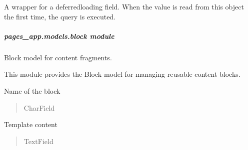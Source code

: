 \documentclass[letterpaper,10pt,english]{sphinxmanual}
\begin{document}
\begin{fulllineitems}

\begin{fulllineitems}
\label{\detokenize{pages_app.models:id1}}
\pysigstartsignatures
\pysigline
{}
\pysigstopsignatures
\sphinxAtStartPar
A wrapper for a deferred\sphinxhyphen{}loading field. When the value is read from this
object the first time, the query is executed.

\end{fulllineitems}


\end{fulllineitems}



\subparagraph{pages\_app.models.block module}
\label{\detokenize{pages_app.models:module-pages_app.models.block}}\label{\detokenize{pages_app.models:pages-app-models-block-module}}
\sphinxAtStartPar
Block model for content fragments.

\sphinxAtStartPar
This module provides the Block model for managing reusable content blocks.

\begin{fulllineitems}
\label{\detokenize{pages_app.models:pages_app.models.block.name}}
\pysigstartsignatures
\pysigline
{}
\pysigstopsignatures
\sphinxAtStartPar
Name of the block
\begin{quote}\begin{description}
\sphinxAtStartPar
CharField

\end{description}\end{quote}

\end{fulllineitems}


\begin{fulllineitems}
\label{\detokenize{pages_app.models:pages_app.models.block.template}}
\pysigstartsignatures
\pysigline
{}
\pysigstopsignatures
\sphinxAtStartPar
Template content
\begin{quote}\begin{description}
\sphinxAtStartPar
TextField

\end{description}\end{quote}

\end{fulllineitems}
\end{document}

